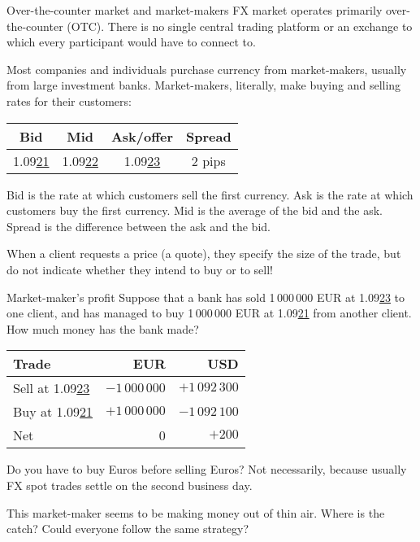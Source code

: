 \documentclass{beamer}
\begin{document}
\begin{frame}{Over-the-counter market and market-makers}
\justify
FX market operates primarily \alert{over-the-counter (OTC)}. There is no single central trading platform or an exchange to which every participant would have to connect to.

\justify
Most companies and individuals purchase currency from market-makers, usually from large investment banks. \alert{Market-makers}, literally, make buying and selling rates for their customers:

\centering
\begin{tabular}{c|c|c|c}
Bid & Mid & Ask/offer & Spread \\ \hline
1.09\underline{21} & 1.09\underline{22} & 1.09\underline{23} & 2 pips
\end{tabular}

\justify
\alert{Bid} is the rate at which customers sell the first currency. \alert{Ask} is the rate at which customers buy the first currency. \alert{Mid} is the average of the bid and the ask. \alert{Spread} is the difference between the ask and the bid.

\justify
When a client requests a price (a quote), they specify the size of the trade, but do not indicate whether they intend to buy or to sell!
\end{frame}



\begin{frame}{Market-maker's profit}
\justify
Suppose that a bank has sold 1\,000\,000 EUR at 1.09\underline{23} to one client, and has managed to buy 1\,000\,000 EUR at 1.09\underline{21} from another client. How much money has the bank made?

\centering
\begin{tabular}{l|r|r}
Trade & EUR & USD \\
\hline
Sell at 1.09\underline{23} & $-1\,000\,000$ & $+1\,092\,300$ \\
Buy at 1.09\underline{21} & $+1\,000\,000$ & $-1\,092\,100$ \\
\hline
Net & 0 & $+200$
\end{tabular}

\justify
Do you have to buy Euros before selling Euros? Not necessarily, because usually FX spot trades  settle on the second business day.

\justify
This market-maker seems to be making money out of thin air. Where is the catch? Could everyone follow the same strategy?
\end{frame}
\end{document}
